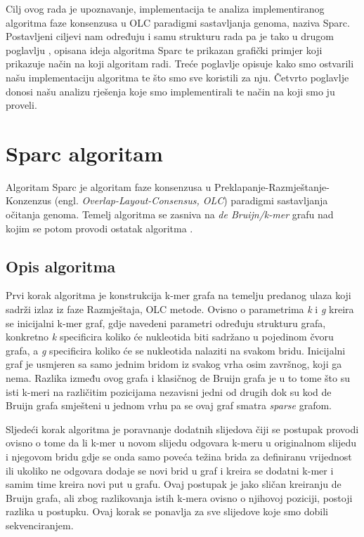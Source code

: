 \documentclass[times, utf8, seminar, numeric]{fer}
\begin{document}
Cilj ovog rada je upoznavanje, implementacija te analiza implementiranog algoritma faze konsenzusa u OLC paradigmi sastavljanja genoma, naziva Sparc. Postavljeni ciljevi nam određuju i samu strukturu rada pa je tako u drugom poglavlju , opisana ideja algoritma Sparc te prikazan grafički primjer koji prikazuje način na koji algoritam radi. Treće poglavlje opisuje kako smo ostvarili našu implementaciju algoritma te što smo sve koristili za nju. Četvrto poglavlje donosi našu analizu rješenja koje smo implementirali te način na koji smo ju proveli.


\chapter{Sparc algoritam}
Algoritam Sparc je algoritam faze konsenzusa u Preklapanje-Razmještanje-Konzenzus (engl. \emph{Overlap-Layout-Consensus, OLC}) paradigmi sastavljanja očitanja genoma. Temelj algoritma se zasniva na \emph{de Bruijn/k-mer} grafu nad kojim se potom provodi ostatak algoritma \cite{Ye2016}.
\section{Opis algoritma}
Prvi korak algoritma je konstrukcija k-mer grafa na temelju predanog ulaza koji sadrži izlaz iz faze Razmještaja, OLC metode. Ovisno o parametrima \emph{k} i \emph{g} kreira se inicijalni k-mer graf, gdje navedeni parametri određuju strukturu grafa, konkretno \emph{k} specificira koliko će nukleotida biti sadržano u pojedinom čvoru grafa, a \emph{g} specificira koliko će se nukleotida nalaziti na svakom bridu. Inicijalni graf je usmjeren sa samo jednim bridom iz svakog vrha osim završnog, koji ga nema. Razlika između ovog grafa i klasičnog de Bruijn grafa je u to tome što su isti k-meri na različitim pozicijama nezavisni jedni od drugih dok su kod de Bruijn grafa smješteni u jednom vrhu pa se ovaj graf smatra \emph {sparse} grafom. 

Sljedeći korak algoritma je poravnanje dodatnih slijedova čiji se postupak provodi ovisno o tome da li k-mer u novom slijedu odgovara k-meru u originalnom slijedu i njegovom bridu gdje se onda samo poveća težina brida za definiranu vrijednost ili ukoliko ne odgovara dodaje se novi brid u graf i kreira se dodatni k-mer i samim time kreira novi put u grafu. Ovaj postupak je jako sličan kreiranju de Bruijn grafa, ali zbog razlikovanja istih k-mera ovisno o njihovoj poziciji, postoji razlika u postupku. Ovaj korak se ponavlja za sve slijedove koje smo dobili sekvenciranjem. 
\end{document}
